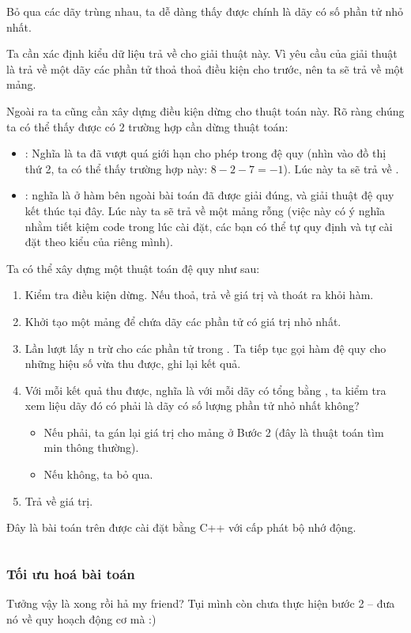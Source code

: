 \documentclass[main.tex]{subfiles}
\begin{document}
Bỏ qua các dãy trùng nhau, ta dễ dàng thấy được  chính là dãy có số phần tử nhỏ nhất.

Ta cần xác định kiểu dữ liệu trả về cho giải thuật này. Vì yêu cầu của giải thuật là trả về một dãy các phần tử thoả thoả điều kiện cho trước, nên ta sẽ trả về một mảng.

Ngoài ra ta cũng cần xây dựng điều kiện dừng cho thuật toán này. Rõ ràng chúng ta có thể thấy được có 2 trường hợp cần dừng thuật toán:
\begin{itemize}
    \item {}: Nghĩa là ta đã vượt quá giới hạn cho phép trong đệ quy (nhìn vào đồ thị thứ 2, ta có thể thấy trường hợp này: $8 - 2 - 7 = -1$). Lúc này ta sẽ trả về .
    \item {}: nghĩa là ở hàm bên ngoài bài toán đã được giải đúng, và giải thuật đệ quy kết thúc tại đây. Lúc này ta sẽ trả về một mảng rỗng (việc này có ý nghĩa nhằm tiết kiệm code trong lúc cài đặt, các bạn có thể tự quy định và tự cài đặt theo kiểu của riêng mình).
\end{itemize}

Ta có thể xây dựng một thuật toán đệ quy như sau:
\begin{enumerate}
    \item Kiểm tra điều kiện dừng. Nếu thoả, trả về giá trị và thoát ra khỏi hàm.
    \item Khởi tạo một mảng để chứa dãy các phần tử có giá trị nhỏ nhất.
    \item Lần lượt lấy \code n trừ cho các phần tử trong . Ta tiếp tục gọi hàm đệ quy cho những hiệu số vừa thu được, ghi lại kết quả.
    \item Với mỗi kết quả thu được, nghĩa là với mỗi dãy có tổng bằng , ta kiểm tra xem liệu dãy đó có phải là dãy có số lượng phần tử nhỏ nhất không?
    \begin{itemize}
        \item Nếu phải, ta gán lại giá trị cho mảng ở Bước 2 (đây là thuật toán tìm min thông thường).
        \item Nếu không, ta bỏ qua.
    \end{itemize}
    \item Trả về giá trị.
\end{enumerate}

Đây là bài toán trên được cài đặt bằng C++ với cấp phát bộ nhớ động.
\inputminted[linenos,breaklines]{cpp}{answer_sources/QuyHoachDong_VetCan.cpp}

\subsubsection{Tối ưu hoá bài toán}
Tưởng vậy là xong rồi hả my friend? Tụi mình còn chưa thực hiện bước 2 -- đưa nó về quy hoạch động cơ mà :)
\end{document}
